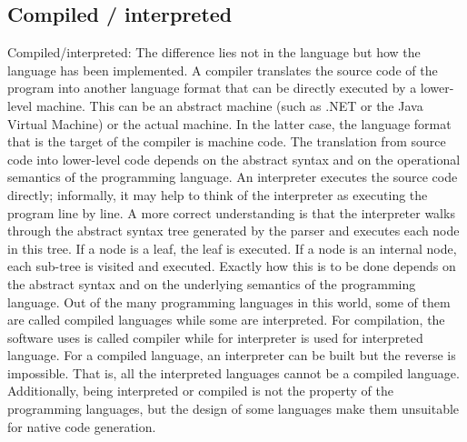 \documentclass{sig-alternate}
\begin{document}
	\subsection{Compiled / interpreted}
	Compiled/interpreted: The difference lies not in the language but how the language has been implemented. A compiler translates the source code of the program into another language format that can be directly executed by a lower-level machine. This can be an abstract machine (such as .NET or the Java Virtual Machine) or the actual machine. In the latter case, the language format that is the target of the compiler is machine code. The translation from source code into lower-level code depends on the abstract syntax and on the operational semantics of the programming language. An interpreter executes the source code directly; informally, it may help to think of the interpreter as executing the program line by line. A more correct understanding is that the interpreter walks through the abstract syntax tree generated by the parser and executes each node in this tree. If a node is a leaf, the leaf is executed. If a node is an internal node, each sub-tree is visited and executed. Exactly how this is to be done depends on the abstract syntax and on the underlying semantics of the programming language.
	Out of the many programming languages in this world, some of them are called compiled languages while some are interpreted. For compilation, the software uses is called compiler while for interpreter is used for interpreted language. For a compiled language, an interpreter can be built but the reverse is impossible. That is, all the interpreted languages cannot be a compiled language. Additionally, being interpreted or compiled is not the property of the programming languages, but the design of some languages make them unsuitable for native code generation.
\end{document}

